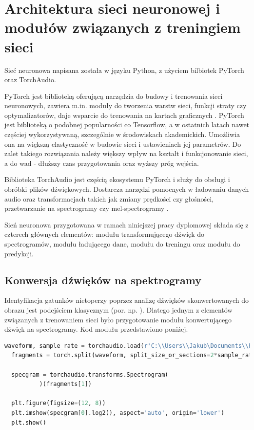 \documentclass{sprz}
\begin{document}
\section{Architektura sieci neuronowej i modułów związanych z treningiem sieci}
Sieć neuronowa napisana została w języku Python, z użyciem bilbiotek PyTorch oraz TorchAudio. 

PyTorch jest biblioteką oferującą narzędzia do budowy i trenowania sieci neuronowych, zawiera m.in. moduły do tworzenia warstw sieci, funkcji straty czy optymalizatorów, daje wsparcie do trenowania na kartach graficznych \cite{pytorch}.
PyTorch jest biblioteką o podobnej popularności co Tensorflow, a w ostatnich latach nawet częściej wykorzystywaną, szczególnie w środowiskach akademickich. Umożliwia ona na większą elastyczność w budowie sieci i ustawieniach jej parametrów. Do zalet takiego rozwiązania należy większy wpływ na kształt i funkcjonowanie sieci, a do wad - dłuższy czas przygotowania oraz wyższy próg wejścia. 

Biblioteka TorchAudio jest częścią ekosystemu PyTorch i służy do obsługi i obróbki plików dźwiękowych. Dostarcza narzędzi pomocnych w ładowaniu danych audio oraz transformacjach takich jak zmiany prędkości czy głośności, przetwarzanie na spectrogramy czy mel-spectrogramy \cite{torchaudio}. 

Sień neuronowa przygotowana w ramach niniejszej pracy dyplomowej składa się z czterech głównych elementów: modułu transformującego dźwięk do spectrogramów, modułu ładującego dane, modułu do treningu oraz modułu do predykcji.

\subsection{Konwersja dźwięków na spektrogramy}
Identyfikacja gatunków nietoperzy poprzez analizę dźwięków skonwertowanych do obrazu jest podejściem klasycznym (por. np. \cite{bats-id-dl2020b}). Dlatego jednym z elementów związanych z trenowaniem sieci było przygotowanie modułu konwertującego dźwięk na spectrogramy. Kod modułu przedstawiono poniżej.

\begin{lstlisting}[language=Python,caption={Implementacja konwersji dźwięku na spektrogram}, label={lst:audio-to-spectrogram}]
  waveform, sample_rate = torchaudio.load(r'C:\\Users\\Jakub\Documents\\PJATK\\INZ\Batmonit_model\\Chiro_sounds_signed\Audio\\PIPNAT\S4U08639_20210731_234142_PIPNAT.wav')
  fragments = torch.split(waveform, split_size_or_sections=2*sample_rate, dim=1)
  
  specgram = torchaudio.transforms.Spectrogram(
          )(fragments[1])
  
  plt.figure(figsize=(12, 8))
  plt.imshow(specgram[0].log2(), aspect='auto', origin='lower')
  plt.show()
\end{lstlisting}
\end{document}
